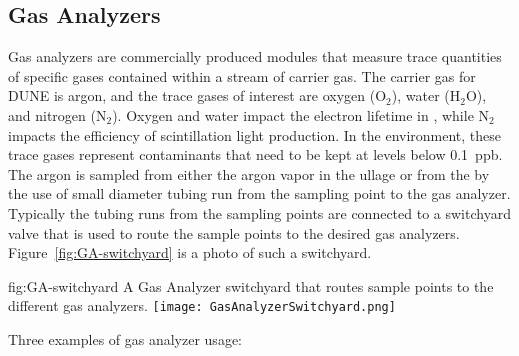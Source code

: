 \subsection{Gas Analyzers}
\label{sec:fdgen-slow-cryo-gas-anlyz}

 Gas analyzers are commercially produced modules that measure trace quantities of specific gases contained within a stream of carrier gas. The carrier gas for DUNE is argon, and the trace gases of interest are oxygen ($\text{O}_2$), water ($\text{H}_2\text{O}$), and nitrogen ($\text{N}_2$). Oxygen and water impact the electron lifetime in , while $\text{N}_2$ impacts the efficiency of scintillation light production. In the  environment, these trace gases represent contaminants that need to be kept at levels below \SI{0.1}{ppb}.
The argon is sampled from either the argon vapor in the ullage or from the  by the use of small diameter tubing run from the sampling point to the gas analyzer. Typically the tubing runs from the sampling points are connected to a switchyard valve that is used to route the sample points to the desired gas analyzers. Figure~\ref{fig:GA-switchyard} is a photo of such a switchyard.

\begin{dunefigure}{fig:GA-switchyard}
  {A Gas Analyzer switchyard that routes sample points to the different gas analyzers.}
  \texttt{[image: GasAnalyzerSwitchyard.png]}%
\end{dunefigure}

Three examples of gas analyzer usage:

